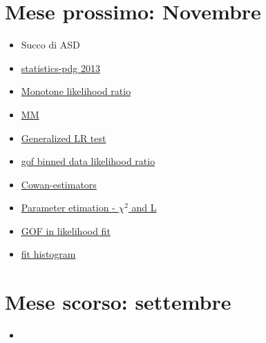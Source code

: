 \documentclass[main.tex]{subfiles}
\begin{document}
\chapter{Mese prossimo: Novembre}



\begin{itemize}
\item Succo di ASD
\item \href{http://pdg.lbl.gov/2013/reviews/rpp2013-rev-statistics.pdf}{statistics-pdg 2013}
\item \href{https://en.m.wikipedia.org/wiki/Monotone_likelihood_ratio}{Monotone likelihood ratio}
\item \href{https://pdfs.semanticscholar.org/b030/c65f8bd32e141ef1a28f7e289921786fadcf.pdf}{MM}
\item \href{https://web.stanford.edu/class/archive/stats/stats200/stats200.1172/Lecture22.pdf}{Generalized LR test}
\item \href{https://www.google.com/search?q=gof%20binned%20data%20likelihood%20ratio&ie=utf-8&oe=utf-8&client=firefox-b-m#sbfbu=1&pi=gof%20binned%20data%20likelihood%20ratio}{gof binned data likelihood ratio}
\item \href{https://agenda.infn.it/event/16360/contributions/33703/attachments/63753/76855/cowan_paestum_2019.pdf}{Cowan-estimators}
\item \href{https://www.physik.hu-berlin.de/de/gk1504/block-courses/autumn-2010/program_and_talks/Verkerke_part3}{Parameter etimation - $\chi^2$ and L}
\item \href{https://arxiv.org/pdf/physics/0509008.pdf}{GOF in likelihood fit}
\item \href{https://physique.cuso.ch/fileadmin/physique/document/jameschap7.pdf}{fit histogram}
\end{itemize}

\chapter{Mese scorso: settembre}

\begin{itemize}
\item 
\end{itemize}
\end{document}
